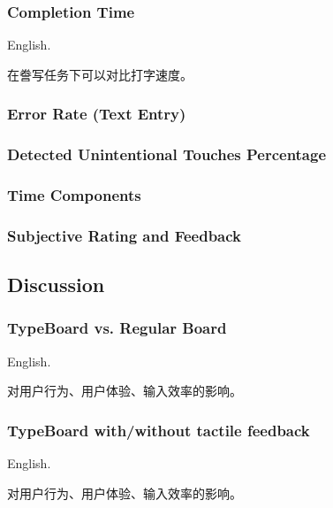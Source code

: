 \subsubsection{Completion Time}

English.

在誊写任务下可以对比打字速度。

\subsubsection{Error Rate (Text Entry)}

\subsubsection{Detected Unintentional Touches Percentage}

\subsubsection{Time Components}

\subsubsection{Subjective Rating and Feedback}

\subsection{Discussion}

\subsubsection{TypeBoard vs. Regular Board}

English.

对用户行为、用户体验、输入效率的影响。

\subsubsection{TypeBoard with/without tactile feedback}

English.

对用户行为、用户体验、输入效率的影响。
